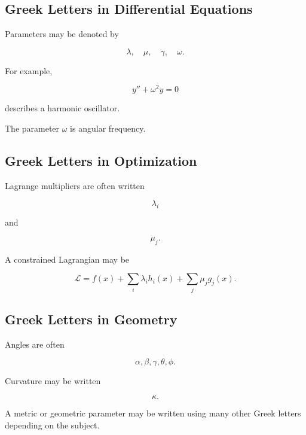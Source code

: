 \subsection{Greek Letters in Differential Equations}
\label{subsec:greek-differential-equation-uses}

Parameters may be denoted by

\[
\boxed{
\lambda,
\quad
\mu,
\quad
\gamma,
\quad
\omega.
}
\]

For example,

\[
\boxed{
y''+\omega^2y=0
}
\]

describes a harmonic oscillator.

The parameter \(\omega\) is angular frequency.

\subsection{Greek Letters in Optimization}
\label{subsec:greek-optimization-uses}

Lagrange multipliers are often written

\[
\boxed{
\lambda_i
}
\]

and

\[
\boxed{
\mu_j.
}
\]

A constrained Lagrangian may be

\[
\boxed{
\mathcal{L}
=
f(x)
+
\sum_i
\lambda_i h_i(x)
+
\sum_j
\mu_j g_j(x).
}
\]

\subsection{Greek Letters in Geometry}
\label{subsec:greek-geometry-uses}

Angles are often

\[
\boxed{
\alpha,\beta,\gamma,\theta,\phi.
}
\]

Curvature may be written

\[
\boxed{
\kappa.
}
\]

A metric or geometric parameter may be written using many other Greek
letters depending on the subject.

